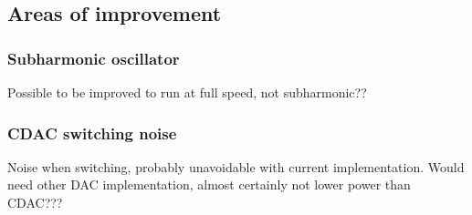


\FloatBarrier

\subsection{Areas of improvement}
	\subsubsection{Subharmonic oscillator}
		Possible to be improved to run at full speed, not subharmonic??

	\subsubsection{CDAC switching noise}
		Noise when switching, probably unavoidable with current implementation. Would need other DAC implementation, almost certainly not lower power than CDAC??? 

\FloatBarrier
